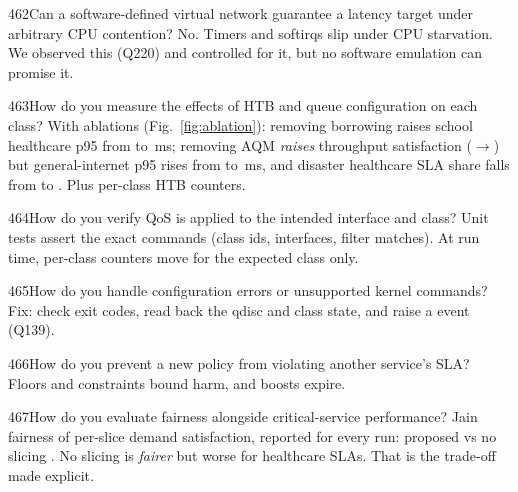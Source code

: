 \begin{qa}{462}{Can a software-defined virtual network guarantee a latency target under arbitrary CPU contention?}
No. Timers and softirqs slip under CPU starvation. We observed this (Q220) and controlled for it, but no software
emulation can promise it.
\end{qa}

\begin{qa}{463}{How do you measure the effects of HTB and queue configuration on each class?}
With ablations (Fig.~\ref{fig:ablation}): removing borrowing raises school healthcare p95 from \NAblSchoolFullHc{} to
\NAblSchoolFullStrictHc\,ms; removing AQM \emph{raises} throughput satisfaction (\NAblSchoolFullUtil{}$\rightarrow$\NAblSchoolNoAqmUtil) but
general-internet p95 rises from \NAblSchoolFullGenP{} to \NAblSchoolNoAqmGenP\,ms, and disaster healthcare SLA share falls
from \NAblDisasterFullHcSla{} to \NAblDisasterNoAqmHcSla. Plus per-class HTB counters.
\end{qa}

\FigAblation

\begin{qa}{464}{How do you verify QoS is applied to the intended interface and class?}
Unit tests assert the exact commands (class ids, interfaces, filter matches). At run time, per-class counters move
for the expected class only.
\end{qa}

\begin{qa}{465}{How do you handle configuration errors or unsupported kernel commands?}
Fix: check exit codes, read back the qdisc and class state, and raise a  event (Q139).
\end{qa}

\begin{qa}{466}{How do you prevent a new policy from violating another service's SLA?}
Floors and constraints bound harm, and boosts expire.
\end{qa}

\begin{qa}{467}{How do you evaluate fairness alongside critical-service performance?}
Jain fairness of per-slice demand satisfaction, reported for every run: proposed \NFairProposed{} vs no slicing
\NFairNoSlicing. No slicing is \emph{fairer} but worse for healthcare SLAs. That is the trade-off made explicit.
\end{qa}

